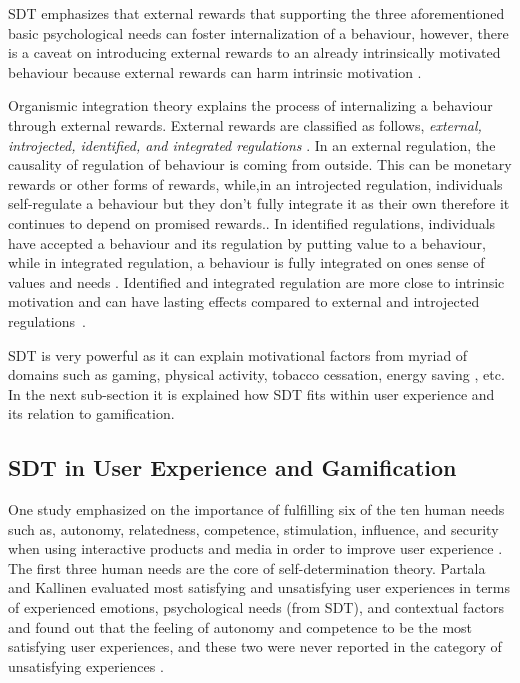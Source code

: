 \documentclass{sig-alternate}
\begin{document}
SDT emphasizes that external rewards that supporting the three aforementioned basic psychological needs can foster internalization of a behaviour, however, there is a caveat on introducing external rewards to an already intrinsically motivated behaviour because external rewards can harm intrinsic motivation \cite{ryan2000:self}.

Organismic integration theory explains the process of internalizing a behaviour through external rewards. External rewards are classified as follows, \emph{external, introjected, identified, and integrated regulations} \cite{ryan2000:self,lee2015:relating}. In an external regulation, the causality of  regulation of behaviour is coming from outside. This can be monetary rewards or other forms of rewards, while,in an introjected regulation, individuals self-regulate a behaviour but they don't fully integrate it as their own therefore it continues to depend on promised rewards.\cite {lee2015:relating}. In identified  regulations, individuals have accepted a behaviour and its regulation by putting value to a behaviour, while in integrated regulation,  a behaviour is fully integrated on ones sense of values and needs \cite{lee2015:relating}. Identified and integrated regulation are more close to intrinsic motivation and can have lasting effects compared to external and introjected regulations~\cite{ryan2000intrinsic}.
 
SDT is very powerful as it can explain motivational factors from myriad of domains such as gaming\cite{ryan2006:motivationalpull}, physical activity\cite{power2011:obesity}, tobacco cessation\cite{williams2006:testing}, energy saving \cite{webb2013:self}, etc. In the next sub-section it is explained how SDT fits within user experience and its relation to gamification.  
\subsection{SDT in User Experience and Gamification}
One study emphasized on the importance of fulfilling six of the ten human needs such as, autonomy, relatedness, competence, stimulation, influence, and security when using interactive products and media in order to improve user experience \cite{wiklund2009:needs}. The first three human needs are the core of self-determination theory. Partala and Kallinen \cite{partala2012:understanding} evaluated most satisfying and unsatisfying user experiences in terms of experienced emotions, psychological needs (from SDT), and contextual factors and found out that the feeling of autonomy and competence to be the most satisfying user experiences, and these two were never reported in the category of unsatisfying experiences \cite{partala2012:understanding}.
\end{document}
